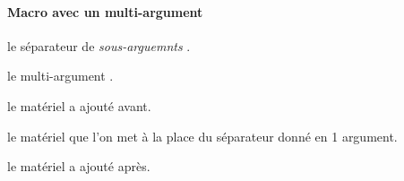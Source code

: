 \documentclass[12pt,a4paper]{article}
\begin{document}
\paragraph{Macro avec un \og multi-argument \fg}


 le séparateur de \emph{\og sous-arguemnts \fg}.

 le \og multi-argument \fg.

 le matériel a ajouté avant.

 le matériel que l'on met à la place du séparateur donné en 1\ier{} argument.

 le matériel a ajouté après.
\end{document}
